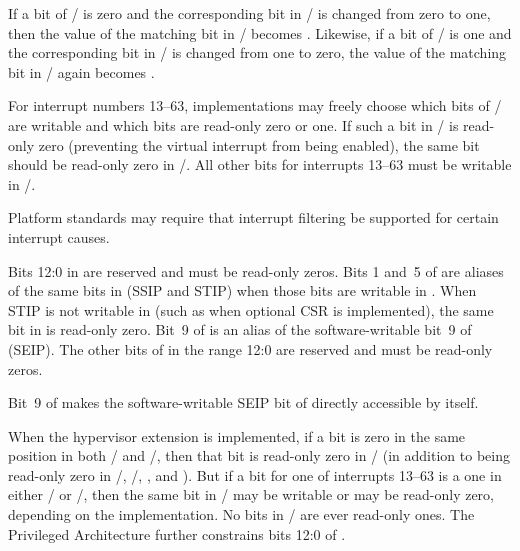 If a bit of / is zero and the corresponding bit
in / is changed from zero to one, then the value
of the matching bit in / becomes {\unspecified}.
Likewise, if a bit of / is one and the corresponding
bit in / is changed from one to zero, the value
of the matching bit in / again becomes {\unspecified}.

For interrupt numbers 13--63, implementations may freely choose which
bits of / are writable and which bits are read-only
zero or one.
If such a bit in / is read-only zero (preventing the
virtual interrupt from being enabled), the same bit should be read-only
zero in /.
All other bits for interrupts 13--63 must be writable in
/.

\begin{commentary}
Platform standards may require that interrupt filtering be supported
for certain interrupt causes.
\end{commentary}

Bits 12:0 in  are reserved and must be read-only zeros.
Bits 1 and~5 of  are aliases of the same bits in 
(SSIP and STIP) when those bits are writable in .
When STIP is not writable in  (such as when optional
CSR  is implemented), the
same bit in  is read-only zero.
Bit~9 of  is an alias of the software-writable bit~9 of 
(SEIP).
The other bits of  in the range 12:0 are reserved and must be
read-only zeros.

\begin{commentary}
Bit~9 of\/  makes the software-writable SEIP bit of\/ 
directly accessible by itself.
\end{commentary}

When the hypervisor extension is implemented, if a bit is
zero in the same position in both /
and /, then that bit is read-only zero in
/ (in addition to being read-only zero
in /, /, , and ).
But if a bit for one of interrupts 13--63 is a one in
either / or /,
then the same bit in / may be writable
or may be read-only zero, depending on the implementation.
No bits in / are ever read-only ones.
The {\RISCV} Privileged Architecture further
constrains bits 12:0 of .

